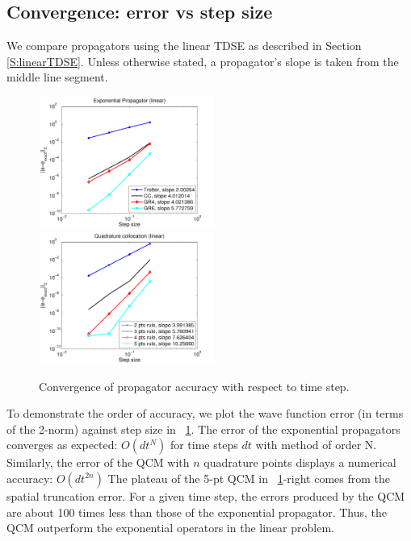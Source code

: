 \documentclass[review,letterpaper]{elsarticle}
\begin{document}
\subsection{Convergence: error vs step size}
We compare propagators using the linear TDSE as described in Section \ref{S:linearTDSE}.
Unless otherwise stated, a propagator's slope is taken from the middle line segment.
\begin{figure}[ht]
\centering
\includegraphics[height=1.7in]{error-norm-2}
\includegraphics[height=1.7in]{error-norm-qc}
\caption{Convergence of propagator accuracy with respect to time step.}
\label{F:errWAVE}
\end{figure}

To demonstrate the order of accuracy, we plot the wave function error
(in terms of the 2-norm) against step size in \figurename~\ref{F:errWAVE}.
The error of the exponential propagators converges as expected: $O(dt^N)$ for time steps $dt$ with method of order N.
Similarly, the error of the QCM with $n$ quadrature points displays a numerical accuracy: $O(dt^{2n})$
The plateau of the 5-pt QCM in \figurename~\ref{F:errWAVE}-right
comes from the spatial truncation error.
For a given time step, the errors produced by the QCM are about 100 times less than
those of the exponential propagator.
Thus, the QCM outperform the exponential operators in the linear problem.
\end{document}
